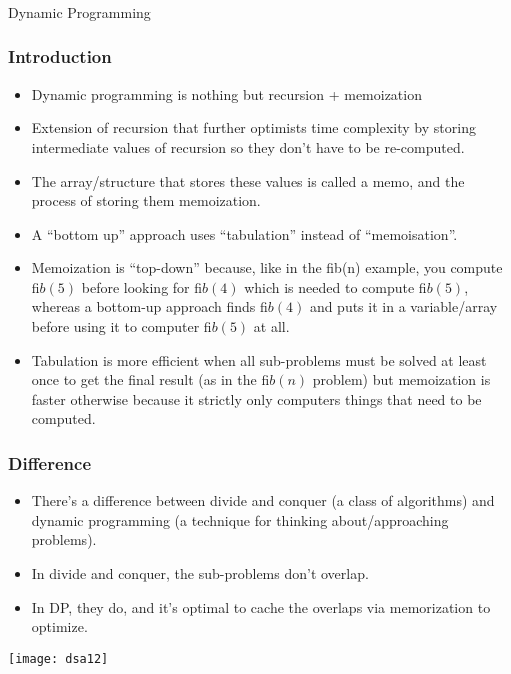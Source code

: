 \begin{frame}[fragile]\frametitle{}
\begin{center}
{\Large Dynamic Programming}
\end{center}

\end{frame}


\begin{frame}
	\frametitle{Introduction}
		
			\begin{itemize}
			\item Dynamic programming is nothing but recursion + memoization
				\item Extension of recursion that further optimists time complexity by storing intermediate values of 
recursion so they don’t have to be re-computed. 
				\item The array/structure that stores these values is 
called a memo, and the process of storing them memoization. 
				\item A ``bottom up” approach uses 
``tabulation” instead of ``memoisation''. 
				\item Memoization is ``top-down'' because, like in the ﬁb(n) 
example, you compute $ﬁb(5)$ before looking for $ﬁb(4)$ which is needed to compute $ﬁb(5)$, whereas a 
bottom-up approach finds $ﬁb(4)$ and puts it in a variable/array before using it to computer $ﬁb(5)$ at 
all. 
				\item Tabulation is more efficient when all sub-problems must be solved at least once to get the final 
result (as in the $ﬁb(n)$ problem) but memoization is faster otherwise because it strictly only 
computers things that need to be computed. 
			\end{itemize}
\end{frame}

\begin{frame}
	\frametitle{Difference}
		
			\begin{itemize}
				\item There’s a difference between divide and conquer (a class of algorithms) and dynamic programming 
(a technique for thinking about/approaching problems). 
\item In divide and conquer, the sub-problems 
don’t overlap. 
\item In DP, they do, and it’s optimal to cache the overlaps via memorization to optimize. 
			\end{itemize}
			
\begin{center}
\texttt{[image: dsa12]}
\end{center}				
\end{frame}

